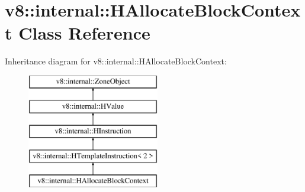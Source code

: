 \hypertarget{classv8_1_1internal_1_1_h_allocate_block_context}{}\section{v8\+:\+:internal\+:\+:H\+Allocate\+Block\+Context Class Reference}
\label{classv8_1_1internal_1_1_h_allocate_block_context}
Inheritance diagram for v8\+:\+:internal\+:\+:H\+Allocate\+Block\+Context\+:\begin{figure}[H]
\begin{center}
\leavevmode
\includegraphics[height=5.000000cm]{classv8_1_1internal_1_1_h_allocate_block_context}
\end{center}
\end{figure}
